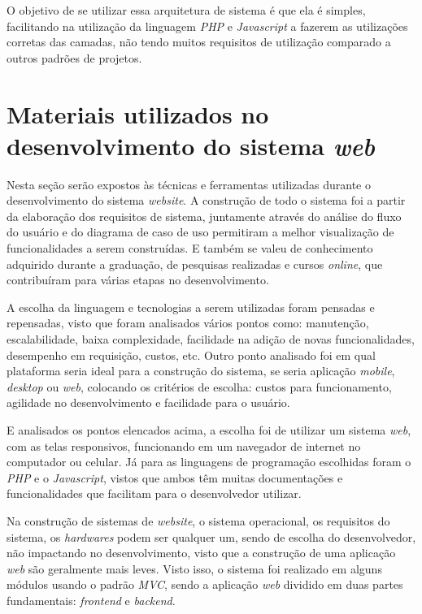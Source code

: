 \documentclass[
	12pt,				%
	openright,			%
	oneside,			%
	a4paper,			%
	english,			%
	french,				%
	spanish,			%
	brazil,				%
	]{abntex2}
\begin{document}
O objetivo de se utilizar essa arquitetura de sistema é que ela é simples, facilitando na utilização da linguagem \textit{PHP} e \textit{Javascript} a fazerem as utilizações corretas das camadas, não tendo muitos requisitos de utilização comparado a outros padrões de projetos.



\section{Materiais utilizados no desenvolvimento do sistema \textit{web}}

Nesta seção serão expostos às técnicas e ferramentas utilizadas durante o desenvolvimento do sistema \textit{website}. A construção de todo o sistema foi a partir da elaboração dos requisitos de sistema, juntamente através do análise do fluxo do usuário e do diagrama de caso de uso permitiram a melhor visualização de funcionalidades a serem construídas. E também se valeu de conhecimento adquirido durante a graduação, de pesquisas realizadas e cursos \textit{online}, que contribuíram para várias etapas no desenvolvimento.

A escolha da linguagem e tecnologias a serem utilizadas foram pensadas e repensadas, visto que foram analisados vários pontos como: manutenção, escalabilidade, baixa complexidade, facilidade na adição de novas funcionalidades, desempenho em requisição, custos, etc.
Outro ponto analisado foi em qual plataforma seria ideal para a construção do sistema, se seria aplicação \textit{mobile}, \textit{desktop} ou \textit{web}, colocando os critérios de escolha: custos para funcionamento, agilidade no desenvolvimento e facilidade para o usuário.

E analisados os pontos elencados acima, a escolha foi de utilizar um sistema \textit{web}, com as telas responsivos, funcionando em um navegador de internet no computador ou celular. Já para as linguagens de programação escolhidas foram o \textit{PHP} e o \textit{Javascript}, vistos que ambos têm muitas documentações e funcionalidades que facilitam para o desenvolvedor utilizar.

Na construção de sistemas de \textit{website}, o sistema operacional, os requisitos do sistema, os \textit{hardwares} podem ser qualquer um, sendo de escolha do desenvolvedor, não impactando no desenvolvimento, visto que a construção de uma aplicação \textit{web} são geralmente mais leves. Visto isso, o sistema foi realizado em alguns módulos usando o padrão \textit{MVC}, sendo a aplicação \textit{web} dividido em duas partes fundamentais: \textit{frontend} e \textit{backend}.  
 
\end{document}
